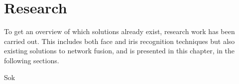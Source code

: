 \chapter{Research}
\label{cha:Research}
To get an overview of which solutions already exist, research work has been carried out. This includes both face and iris recognition techniques but also existing solutions to network fusion, and is presented in this chapter, in the following sections.



Sok

